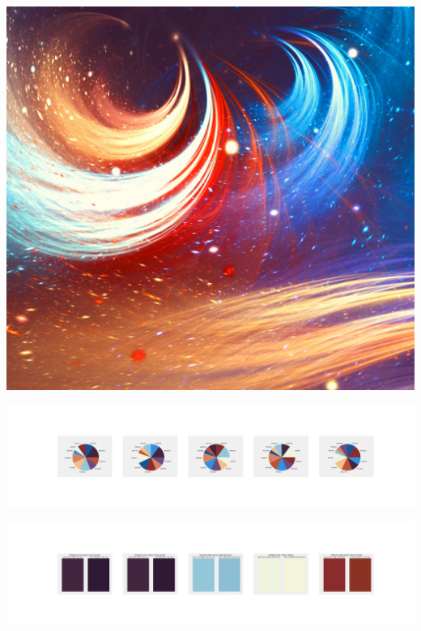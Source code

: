 \documentclass[11pt]{article}
\begin{document}
\begin{landscape}
    \begin{center}
    \includegraphics[width=\textwidth]{./nbimg/file (129).jpg}
    \end{center}

    \begin{center}
    \includegraphics[width=250mm]{./nbimg/pie-33.jpg}
    \end{center}

    \begin{center}
    \includegraphics[width=250mm]{./nbimg/peak-33.jpg}
    \end{center}
    


\end{landscape}
\end{document}
